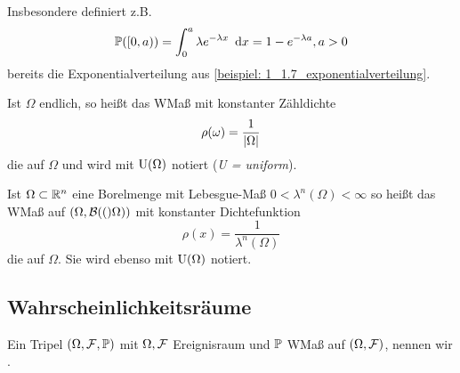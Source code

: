 Insbesondere definiert z.B.
\begin{equation*}
    \P([0,a)) = \int_{0}^{a} \lambda e^{-\lambda x} \dx = 1 - e^{-\lambda a}, a > 0
\end{equation*}
bereits die Exponentialverteilung aus \cref{beispiel: 1_1.7_exponentialverteilung}.


\begin{definition}[Gleichverteilung] \label{def: 1.10_gleichverteilung}
    Ist $\Omega$ endlich, so heißt das WMaß mit konstanter Zähldichte 
    \begin{equation*}
        \rho(\omega) = \frac{1}{\abs{\Omega}}
    \end{equation*} 
    die  auf $\Omega$ und wird mit $\Uni(\Omega)$ notiert (\textit{U = uniform}).
    
    Ist $\Omega \subset \Rn$ eine Borelmenge mit Lebesgue-Maß $0 < \lambda^n(\Omega) < \infty$ so heißt das WMaß auf $(\Omega, \borel(\Omega))$ mit konstanter Dichtefunktion 
    \begin{equation*}
        \rho(x) = \frac{1}{\lambda^n(\Omega)}
    \end{equation*} 
    die  auf $\Omega$. 
    Sie wird ebenso mit $\Uni(\Omega)$ notiert.
\end{definition}

\subsection*{Wahrscheinlichkeitsräume}

\begin{definition}[Wahrscheinlichkeitsraum]
    Ein Tripel $(\Omega, \ereignisF, \P)$ mit $\Omega, \ereignisF$ Ereignisraum und $\P$ WMaß auf $(\Omega, \ereignisF)$, nennen wir .
\end{definition}